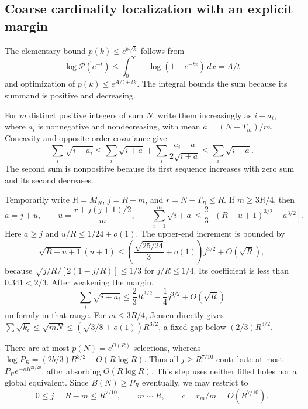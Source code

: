 \documentclass[11pt]{article}
\theoremstyle{remark}\newtheorem{remark}[theorem]{Remark}
\newcommand{\cP}{\mathcal P}
\begin{document}
\subsection{Coarse cardinality localization with an explicit margin}
The elementary bound $p(k)\le e^{b\sqrt k}$ follows from
\[
 \log\cP(e^{-t})\le\int_0^\infty-\log(1-e^{-tx})\,dx=A/t
\]
and optimization of $p(k)\le e^{A/t+tk}$. The integral bounds the sum because its summand is positive and decreasing.

For $m$ distinct positive integers of sum $N$, write them increasingly as $i+a_i$, where $a_i$ is nonnegative and nondecreasing, with mean $a=(N-T_m)/m$. Concavity and opposite-order covariance give
\begin{equation}\label{stp:sum:eq:covariance}
 \sum_i\sqrt{i+a_i}\le\sum_i\sqrt{i+a}
 +\sum_i\frac{a_i-a}{2\sqrt{i+a}}
 \le\sum_i\sqrt{i+a}.
\end{equation}
The second sum is nonpositive because its first sequence increases with zero sum and its second decreases.

Temporarily write $R=M_N$, $j=R-m$, and $r=N-T_R\le R$. If $m\ge3R/4$, then
\[
 a=j+u,\qquad u=\frac{r+j(j+1)/2}{m},\qquad
 \sum_{i=1}^m\sqrt{i+a}\le\frac23[(R+u+1)^{3/2}-a^{3/2}].
\]
Here $a\ge j$ and $u/R\le1/24+o(1)$. The upper-end increment is bounded by
\[
 \sqrt{R+u+1}(u+1)
 \le\left(\frac{\sqrt{25/24}}3+o(1)\right)j^{3/2}+O(\sqrt R),
\]
because $\sqrt{j/R}/[2(1-j/R)]\le1/3$ for $j/R\le1/4$. Its coefficient is less than $0.341<2/3$. After weakening the margin,
\begin{equation}\label{stp:sum:eq:coarsegap}
 \sum_i\sqrt{i+a_i}\le\frac23R^{3/2}-\frac14j^{3/2}+O(\sqrt R)
\end{equation}
uniformly in that range. For $m\le3R/4$, Jensen directly gives
$\sum\sqrt{k_i}\le\sqrt{mN}\le(\sqrt{3/8}+o(1))R^{3/2}$, a fixed gap below $(2/3)R^{3/2}$.

There are at most $p(N)=e^{O(R)}$ selections, whereas $\log P_R=(2b/3)R^{3/2}-O(R\log R)$. Thus all $j\ge R^{7/10}$ contribute at most $P_Re^{-\kappa R^{21/20}}$, after absorbing $O(R\log R)$. This step uses neither filled holes nor a global equivalent. Since $B(N)\ge P_R$ eventually, we may restrict to
\begin{equation}\label{stp:sum:eq:coarsewindow}
 0\le j=R-m\le R^{7/10},\qquad m\sim R,\qquad c=r_m/m=O(R^{7/10}).
\end{equation}
\end{document}
